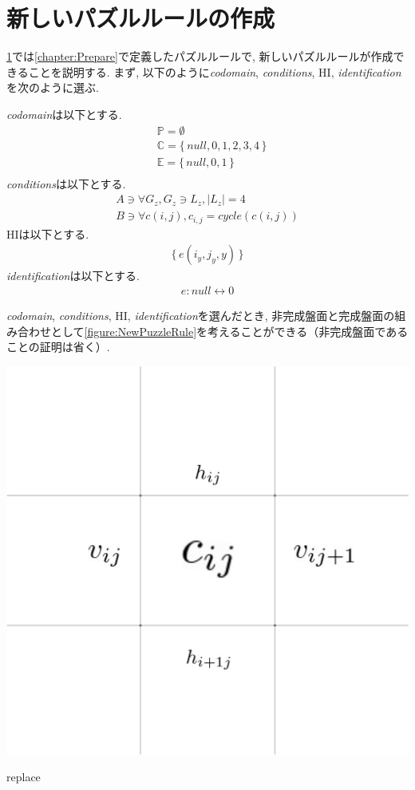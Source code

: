 \section{新しいパズルルールの作成}\label{section:NewPuzzleRule}
\cref{section:NewPuzzleRule}では\cref{chapter:Prepare}で定義したパズルルールで, 新しいパズルルールが作成できることを説明する. まず, 以下のように\textit{codomain}, \textit{conditions}, HI, \textit{identification}を次のように選ぶ.

\textit{codomain}は以下とする.
\begin{align}
   & \mathbb{P}=\emptyset                       \\
   & \mathbb{C}=\{\,\textit{null},0,1,2,3,4\,\} \\
   & \mathbb{E}=\{\,\textit{null},0,1\,\}       \\
\end{align}
\textit{conditions}は以下とする.
\begin{align}
  A\ni \forall G_z, G_z\ni L_z, |L_z|=4 \\
  B\ni \forall c(i,j), c_{i,j}= cycle(c(i,j))
\end{align}
HIは以下とする.
\begin{align}
  \{\,e(i_y,j_y,y)\,\}
\end{align}
\textit{identification}は以下とする.
\begin{align}
  e:\textit{null}\leftrightarrow 0
\end{align}

\textit{codomain}, \textit{conditions}, HI, \textit{identification}を選んだとき, 非完成盤面と完成盤面の組み合わせとして\cref{figure:NewPuzzleRule}を考えることができる（非完成盤面であることの証明は省く）.

\begin{clearpagefigure}
  \includegraphics[width=0.8\linewidth,clip]{fig/cycle.png}
  \caption{replace}
  \label{figure:SlitherLinkQuestion}
\end{clearpagefigure}


